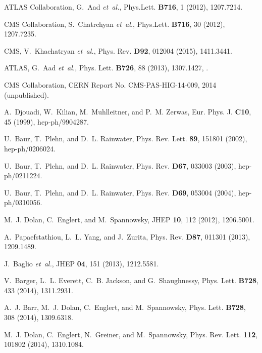 \documentclass[a4paper,amsmath,preprintnumbers,showpacs,twocolumn,prl,superscriptaddress, nofootinbib]{revtex4}
\begin{document}
\begin{thebibliography}{100}

ATLAS Collaboration, G.~Aad {\em et~al.},
\newblock Phys.Lett. {\bf B716}, 1 (2012), 1207.7214.

CMS Collaboration, S.~Chatrchyan {\em et~al.},
\newblock Phys.Lett. {\bf B716}, 30 (2012), 1207.7235.

CMS, V.~Khachatryan {\em et~al.},
\newblock Phys. Rev. {\bf D92}, 012004 (2015), 1411.3441.

ATLAS, G.~Aad {\em et~al.},
\newblock Phys. Lett. {\bf B726}, 88 (2013), 1307.1427,
.

CMS Collaboration,
\newblock CERN Report No. CMS-PAS-HIG-14-009, 2014 (unpublished).

A.~Djouadi, W.~Kilian, M.~Muhlleitner, and P.~M. Zerwas,
\newblock Eur. Phys. J. {\bf C10}, 45 (1999), hep-ph/9904287.

U.~Baur, T.~Plehn, and D.~L. Rainwater,
\newblock Phys. Rev. Lett. {\bf 89}, 151801 (2002), hep-ph/0206024.

U.~Baur, T.~Plehn, and D.~L. Rainwater,
\newblock Phys. Rev. {\bf D67}, 033003 (2003), hep-ph/0211224.

U.~Baur, T.~Plehn, and D.~L. Rainwater,
\newblock Phys. Rev. {\bf D69}, 053004 (2004), hep-ph/0310056.

M.~J. Dolan, C.~Englert, and M.~Spannowsky,
\newblock JHEP {\bf 10}, 112 (2012), 1206.5001.

A.~Papaefstathiou, L.~L. Yang, and J.~Zurita,
\newblock Phys. Rev. {\bf D87}, 011301 (2013), 1209.1489.

J.~Baglio {\em et~al.},
\newblock JHEP {\bf 04}, 151 (2013), 1212.5581.

V.~Barger, L.~L. Everett, C.~B. Jackson, and G.~Shaughnessy,
\newblock Phys. Lett. {\bf B728}, 433 (2014), 1311.2931.

A.~J. Barr, M.~J. Dolan, C.~Englert, and M.~Spannowsky,
\newblock Phys. Lett. {\bf B728}, 308 (2014), 1309.6318.

M.~J. Dolan, C.~Englert, N.~Greiner, and M.~Spannowsky,
\newblock Phys. Rev. Lett. {\bf 112}, 101802 (2014), 1310.1084.


\end{thebibliography}
\end{document}
